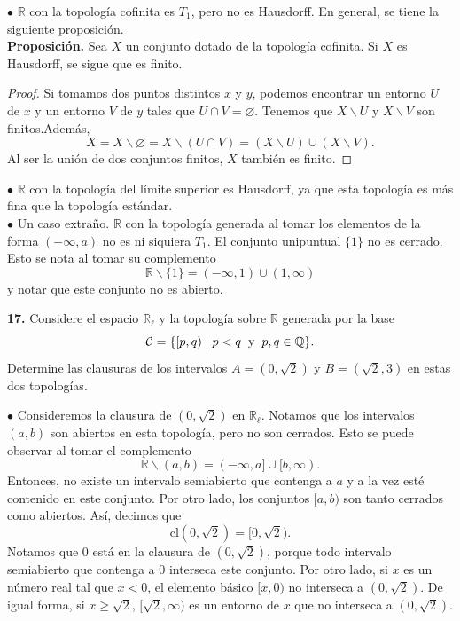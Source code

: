 \documentclass{article}
\begin{document}
$\bullet$ $\mathbb{R}$ con la topología cofinita es $T_{1}$, pero no es Hausdorff. En general, se tiene la siguiente proposición.\\

\textbf{Proposición. } Sea $X$ un conjunto dotado de la topología cofinita. Si $X$ es Hausdorff, se sigue que es finito.  \\
\begin{proof}
	Si tomamos dos puntos distintos $x$ y $y$, podemos encontrar un entorno $U$ de $x$ y un entorno $V$ de $y$ tales que $U \cap V = \varnothing$. Tenemos que $X \backslash U$ y $X \backslash V$ son finitos.Además, 
	$$ X = X \backslash \varnothing = X \backslash (U \cap V) = (X \backslash U) \cup (X \backslash V). $$
	Al ser la unión de dos conjuntos finitos, $X$ también es finito. 
\end{proof}

$\bullet $ $\mathbb{R}$ con la topología del límite superior es Hausdorff, ya que esta topología es más fina que la topología estándar. \\

$\bullet$ Un caso extraño. $\mathbb{R}$ con la topología generada al tomar los elementos de la forma $(-\infty, a)$ no es ni siquiera $T_{1}$. El conjunto unipuntual $\{1 \}$ no es cerrado. Esto se nota al tomar su complemento 
$$ \mathbb{R} \backslash \{ 1 \} = (-\infty, 1) \cup (1, \infty) $$
y notar que este conjunto no es abierto. 

\begin{mybox}
	\textbf{17. } Considere el espacio $\mathbb{R}_{\ell}$ y la topología sobre $\mathbb{R}$ generada por la base
	$$ \mathcal{C} = \{ [p, q) \mid p < q \hspace{0.2cm} \text{y} \hspace{0.2cm} p, q \in \mathbb{Q} \} .$$
	Determine las clausuras de los intervalos $A = (0, \sqrt{2})$ y $B = (\sqrt{2}, 3)$ en estas dos topologías. 
\end{mybox}	
$\bullet$ Consideremos la clausura de $(0, \sqrt{2})$ en $\mathbb{R}_{\ell}$. Notamos que los intervalos $(a, b)$ son abiertos en esta topología, pero no son cerrados. Esto se puede observar al tomar el complemento
$$ \mathbb{R} \backslash (a, b) = (- \infty, a] \cup [b, \infty). $$
Entonces, no existe un intervalo semiabierto que contenga a $a$ y a la vez esté contenido en este conjunto. Por otro lado, los conjuntos $[a, b)$ son tanto cerrados como abiertos. Así, decimos que 
$$ \text{cl}(0, \sqrt{2}) = [0, \sqrt{2}). $$
Notamos que $0$ está en la clausura de $(0, \sqrt{2})$, porque todo intervalo semiabierto que contenga a $0$ interseca este conjunto. Por otro lado, si $x$ es un número real tal que $x < 0$, el elemento básico $[x, 0)$ no interseca a $(0, \sqrt{2})$. De igual forma, si $x \geq \sqrt{2}$, $[\sqrt{2}, \infty)$ es un entorno de $x$ que no interseca a $(0, \sqrt{2})$. \\
\end{document}
